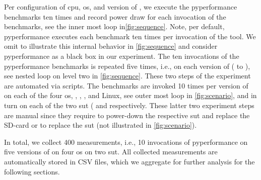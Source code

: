 Per configuration of \gls{cpu}, \gls{os}, and version of \python, we execute the \gls{pyperformance} benchmarks ten times and record power draw for each invocation of the benchmarks, see the inner most loop in\autoref{fig:sequence}.
Note, per default, \gls{pyperformance} executes each benchmark ten times per invocation of the tool.
We omit to illustrate this internal behavior in \autoref{fig:sequence} and consider \gls{pyperformance} as a black box in our experiment.
The ten invocations of the \gls{pyperformance} benchmarks is repeated five times, i.e., on each version of \python ( to ), see nested loop on level two in \autoref{fig:sequence}.
These two steps of the experiment are automated via scripts.
The benchmarks are invoked 10 times per version of \python on each of the four \gls{os}, , , , and  Linux, see outer most loop in \autoref{fig:scenario}, and in turn on each of the two \gls{sut} ( and  respectively.
These latter two experiment steps are manual since they require to power-down the respective \gls{sut} and replace the SD-card or to replace the \gls{sut} (not illustrated in \autoref{fig:scenario}).

In total, we collect 400 measurements, i.e., 10 invocations of \gls{pyperformance} on five versions of \python on four \gls{os} on two \gls{sut}.
All collected measurements are automatically stored in CSV files, which we aggregate for further analysis for the following sections.